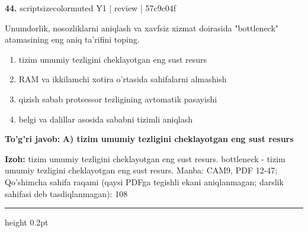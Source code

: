 \documentclass[10pt,a4paper]{article}
\begin{document}
{\bfseries\sffamily\color{ink} 44.} {scriptsizecolor{muted} Y1 | review | 57c9c04f}
\par
Unumdorlik, nosozliklarni aniqlash va xavfsiz xizmat doirasida "bottleneck" atamasining eng aniq ta'rifini toping.
\begin{enumerate}[label=\Alph*),leftmargin=9mm]
\item tizim umumiy tezligini cheklayotgan eng sust resurs
\item RAM va ikkilamchi xotira o'rtasida sahifalarni almashish
\item qizish sabab protsessor tezligining avtomatik pasayishi
\item belgi va dalillar asosida sababni tizimli aniqlash
\end{enumerate}
\begin{tcolorbox}[enhanced,breakable,colback=teal!4,colframe=teal!60!black,boxrule=0.45pt,arc=1.2mm,left=2.7mm,right=2.7mm,top=1.8mm,bottom=1.8mm,before skip=2mm,after skip=2mm]
{\bfseries\sffamily\color{teal}To'g'ri javob:} \textbf{A) tizim umumiy tezligini cheklayotgan eng sust resurs}
\par\smallskip
{\bfseries Izoh:} tizim umumiy tezligini cheklayotgan eng sust resurs. bottleneck - tizim umumiy tezligini cheklayotgan eng sust resurs. Manba: CAM9, PDF 12-47; Qo'shimcha sahifa raqami (qaysi PDFga tegishli ekani aniqlanmagan; darslik sahifasi deb tasdiqlanmagan): 108
\end{tcolorbox}
\vspace{2mm}\hrule height 0.2pt\vspace{3mm}
\end{document}
